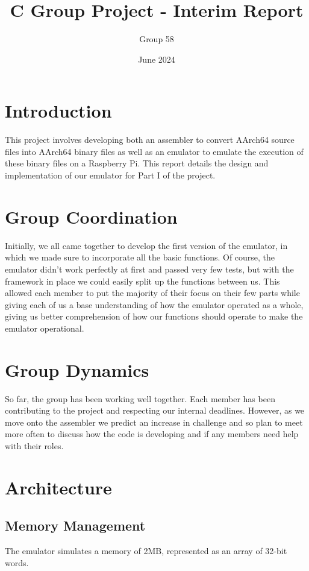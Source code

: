 \documentclass[a4paper, 10pt]{article}
\title{C Group Project -  Interim Report}
\author{Group 58}
\date{June 2024}
\begin{document}
\maketitle

\section{Introduction}
This project involves developing both an assembler to convert AArch64 source files into AArch64 binary files as well as an emulator to emulate the execution of these binary files on a Raspberry Pi. This report details the design and implementation of our emulator for Part I of the project.


\section{Group Coordination}
Initially, we all came together to develop the first version of the emulator, in which we made sure to incorporate all the basic functions. Of course, the emulator didn't work perfectly at first and passed very few tests, but with the framework in place we could easily split up the functions between us. This allowed each member to put the majority of their focus on their few parts while giving each of us a base understanding of how the emulator operated as a whole, giving us better comprehension of how our functions should operate to make the emulator operational.


\section{Group Dynamics}
So far, the group has been working well together. Each member has been contributing to the project and respecting our internal deadlines. However, as we move onto the assembler we predict an increase in challenge and so plan to meet more often to discuss how the code is developing and if any members need help with their roles.

\section{Architecture}

\subsection{Memory Management}
The emulator simulates a memory of 2MB, represented as an array of 32-bit words.
\end{document}
